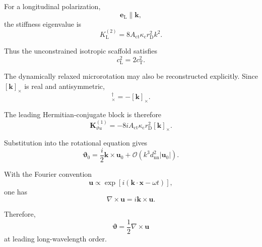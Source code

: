 For a longitudinal polarization,
\begin{equation}
    \mathbf{e}_{\mathrm{L}}\parallel\mathbf{k},
\end{equation}
the stiffness eigenvalue is
\begin{equation}
    K_{\mathrm{L}}^{(2)}
    =
    8A_{\mathrm{ct}}\kappa_{\mathrm{c}}r_{\mathrm{D}}^2k^2.
\end{equation}

Thus the unconstrained isotropic scaffold satisfies
\begin{equation}
    c_{\mathrm{L}}^2
    =
    2c_{\mathrm{T}}^2.
\end{equation}

The dynamically relaxed microrotation may also be reconstructed explicitly. Since $[\mathbf{k}]_{\times}$ is real and antisymmetric,
\begin{equation}
    [\mathbf{k}]_{\times}^{\dagger}
    =
    -[\mathbf{k}]_{\times}.
\end{equation}

The leading Hermitian-conjugate block is therefore
\begin{equation}
    \mathbf{K}_{\vartheta u}^{(1)}
    =
    -8iA_{\mathrm{ct}}\kappa_{\mathrm{c}}r_{\mathrm{D}}^2[\mathbf{k}]_{\times}.
\end{equation}

Substitution into the rotational equation gives
\begin{equation}
    \boldsymbol{\vartheta}_0
    =
    \frac{i}{2}
    \mathbf{k}\times\mathbf{u}_0
    +
    \mathcal{O}\!\left(
        k^3d_{\mathrm{nn}}^2
        |\mathbf{u}_0|
    \right).
\end{equation}

With the Fourier convention
\begin{equation}
    \mathbf{u}
    \propto
    \exp
    \left[
        i
        \left(
            \mathbf{k}\cdot\mathbf{x}
            -
            \omega t
        \right)
    \right],
\end{equation}
one has
\begin{equation}
    \nabla\times\mathbf{u}
    =
    i\mathbf{k}\times\mathbf{u}.
\end{equation}

Therefore,
\begin{equation}
    \boxed{
    \boldsymbol{\vartheta}
    =
    \frac{1}{2}
    \nabla\times\mathbf{u}
    }
\end{equation}
at leading long-wavelength order.

